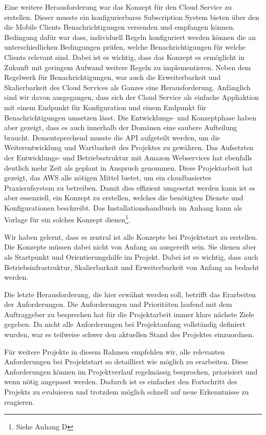 Eine weitere Herausforderung war das Konzept für den Cloud Service zu erstellen.
Dieser musste ein konfigurierbares Subscription System bieten über den die Mobile Clients Benachrichtigungen versenden und empfangen können.
Bedingung dafür war dass, individuell Regeln konfiguriert werden können die an unterschiedlichen Bedingungen prüfen, welche Benachrichtigungen für welche Clients relevant sind.
Dabei ist es wichtig, dass das Konzept es ermöglicht in Zukunft mit geringem Aufwand weitere Regeln zu implementieren.
Neben dem Regelwerk für Benachrichtigungen, war auch die Erweiterbarkeit und Skalierbarkeit des Cloud Services als Ganzes eine Herausforderung.
Anfänglich sind wir davon ausgegangen, dass sich der Cloud Service als einfache Appliaktion mit einem Endpunkt für Konfiguration und einem Endpunkt für Benachrichtigungen umsetzen lässt.
Die Entwicklungs- und Konzeptphase haben aber gezeigt, dass es auch innerhalb der Domänen eine saubere Aufteilung braucht.
Dementsprechend musste die API aufgeteilt werden, um die Weiterentwicklung und Wartbarkeit des Projektes zu gewähren.
Das Aufsetzten der Entwicklungs- und Betriebsstruktur mit Amazon Webservices hat ebenfalls deutlich mehr Zeit als geplant in Anspruch genommen.
Diese Projektarbeit hat gezeigt, das AWS alle nötigen Mittel bietet, um ein cloudbasiertes Praxisrufsystem zu betreiben.
Damit dies effizient umgesetzt werden kann ist es aber essenziell, ein Konzept zu erstellen, welches die benötigten Dienste und Konfigurationen beschreibt.
Das Installationshandbuch im Anhang kann als Vorlage für ein solches Konzept dienen\footnote{Siehe Anhang D}.

Wir haben gelernt, dass es zentral ist alle Konzepte bei Projektstart zu erstellen.
Die Konzepte müssen dabei nicht von Anfang an ausgereift sein.
Sie dienen aber als Startpunkt und Orientierungshilfe im Projekt.
Dabei ist es wichtig, dass auch Betriebsinfrastruktur, Skalierbarkait und Erweiterbarkeit von Anfang an bedacht werden.

Die letzte Herausforderung, die hier erwähnt werden soll, betrifft das Erarbeiten der Anforderungen.
Die Anforderungen und Prioritäten laufend mit dem Auftraggeber zu besprechen hat für die Projektarbeit immer klare nächste Ziele gegeben.
Da nicht alle Anforderungen bei Projektanfang vollständig definiert wurden, war es teilweise schwer den aktuellen Stand des Projektes einzuordnen.

Für weitere Projekte in diesem Rahmen empfehlen wir, alle relevanten Anforderungen bei Projektstart so detailliert wie möglich zu erarbeiten.
Diese Anforderungen können im Projektverlauf regelmässig besprochen, priorisiert und wenn nötig angepasst werden.
Dadurch ist es einfacher den Fortschritt des Projekts zu evaluieren und trotzdem möglich schnell auf neue Erkenntnisse zu reagieren.

\clearpage
